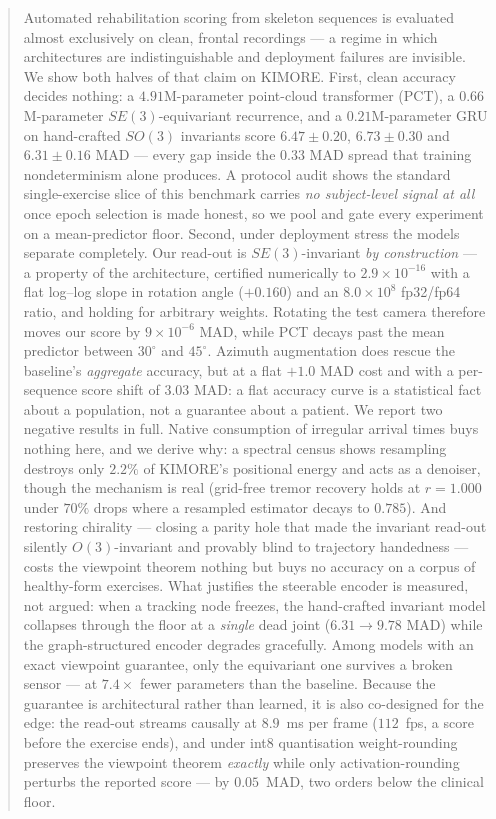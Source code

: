 \documentclass[10pt,journal]{IEEEtran}
\begin{document}
\begin{abstract}
Automated rehabilitation scoring from skeleton sequences is evaluated almost exclusively on clean, frontal recordings --- a regime in which architectures are indistinguishable and deployment failures are invisible. We show both halves of that claim on KIMORE. First, clean accuracy decides nothing: a $4.91$M-parameter point-cloud transformer (PCT), a $0.66$M-parameter $SE(3)$-equivariant recurrence, and a $0.21$M-parameter GRU on hand-crafted $SO(3)$ invariants score $6.47\pm0.20$, $6.73\pm0.30$ and $6.31\pm0.16$ MAD --- every gap inside the $0.33$ MAD spread that training nondeterminism alone produces. A protocol audit shows the standard single-exercise slice of this benchmark carries \emph{no subject-level signal at all} once epoch selection is made honest, so we pool and gate every experiment on a mean-predictor floor. Second, under deployment stress the models separate completely. Our read-out is $SE(3)$-invariant \emph{by construction} --- a property of the architecture, certified numerically to $2.9\times10^{-16}$ with a flat log--log slope in rotation angle ($+0.160$) and an $8.0\times10^{8}$ fp32/fp64 ratio, and holding for arbitrary weights. Rotating the test camera therefore moves our score by $9\times10^{-6}$ MAD, while PCT decays past the mean predictor between $30^\circ$ and $45^\circ$. Azimuth augmentation does rescue the baseline's \emph{aggregate} accuracy, but at a flat $+1.0$ MAD cost and with a per-sequence score shift of $3.03$ MAD: a flat accuracy curve is a statistical fact about a population, not a guarantee about a patient. We report two negative results in full. Native consumption of irregular arrival times buys nothing here, and we derive why: a spectral census shows resampling destroys only $2.2\%$ of KIMORE's positional energy and acts as a denoiser, though the mechanism is real (grid-free tremor recovery holds at $r=1.000$ under $70\%$ drops where a resampled estimator decays to $0.785$). And restoring chirality --- closing a parity hole that made the invariant read-out silently $O(3)$-invariant and provably blind to trajectory handedness --- costs the viewpoint theorem nothing but buys no accuracy on a corpus of healthy-form exercises. What justifies the steerable encoder is measured, not argued: when a tracking node freezes, the hand-crafted invariant model collapses through the floor at a \emph{single} dead joint ($6.31\!\to\!9.78$ MAD) while the graph-structured encoder degrades gracefully. Among models with an exact viewpoint guarantee, only the equivariant one survives a broken sensor --- at $7.4\times$ fewer parameters than the baseline. Because the guarantee is architectural rather than learned, it is also co-designed for the edge: the read-out streams causally at $8.9$~ms per frame ($112$~fps, a score before the exercise ends), and under int8 quantisation weight-rounding preserves the viewpoint theorem \emph{exactly} while only activation-rounding perturbs the reported score --- by $0.05$~MAD, two orders below the clinical floor.
\end{abstract}
\end{document}
